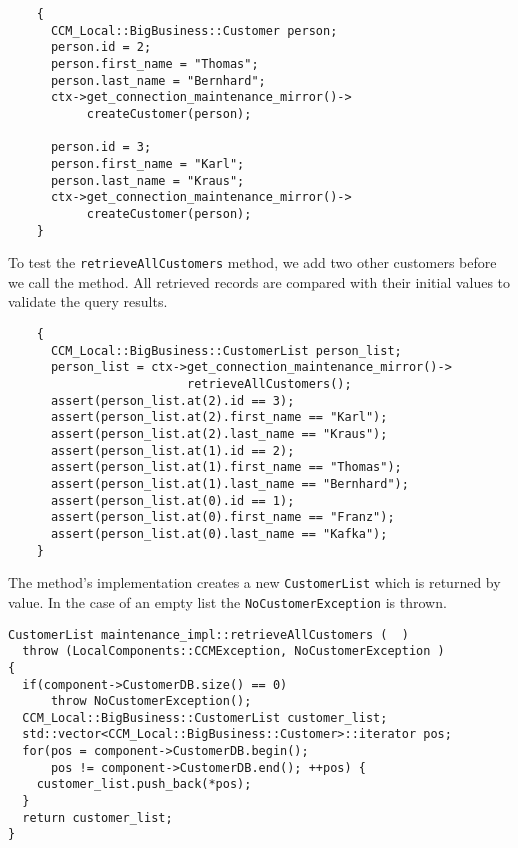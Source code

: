 \begin{small}
\begin{verbatim}
    {
      CCM_Local::BigBusiness::Customer person;
      person.id = 2;
      person.first_name = "Thomas";
      person.last_name = "Bernhard";
      ctx->get_connection_maintenance_mirror()->
           createCustomer(person);

      person.id = 3;
      person.first_name = "Karl";
      person.last_name = "Kraus";
      ctx->get_connection_maintenance_mirror()->
           createCustomer(person);
    }
\end{verbatim}
\end{small}

To test the {\tt retrieveAllCustomers} method, we add two other customers before
we call the method. All retrieved records are compared with their initial values
to validate the query results. 

\begin{small}
\begin{verbatim}
    {
      CCM_Local::BigBusiness::CustomerList person_list;
      person_list = ctx->get_connection_maintenance_mirror()->
                         retrieveAllCustomers();
      assert(person_list.at(2).id == 3);
      assert(person_list.at(2).first_name == "Karl");
      assert(person_list.at(2).last_name == "Kraus");
      assert(person_list.at(1).id == 2);
      assert(person_list.at(1).first_name == "Thomas");
      assert(person_list.at(1).last_name == "Bernhard");
      assert(person_list.at(0).id == 1);
      assert(person_list.at(0).first_name == "Franz");
      assert(person_list.at(0).last_name == "Kafka");
    }      
\end{verbatim}
\end{small}

The method's implementation creates a new {\tt CustomerList} which
is returned by value.
In the case of an empty list the {\tt NoCustomerException} is thrown.

\begin{small}
\begin{verbatim}
CustomerList maintenance_impl::retrieveAllCustomers (  )
  throw (LocalComponents::CCMException, NoCustomerException )
{
  if(component->CustomerDB.size() == 0)
      throw NoCustomerException();
  CCM_Local::BigBusiness::CustomerList customer_list;
  std::vector<CCM_Local::BigBusiness::Customer>::iterator pos;
  for(pos = component->CustomerDB.begin(); 
      pos != component->CustomerDB.end(); ++pos) {
    customer_list.push_back(*pos);
  }
  return customer_list;
}
\end{verbatim}
\end{small}


